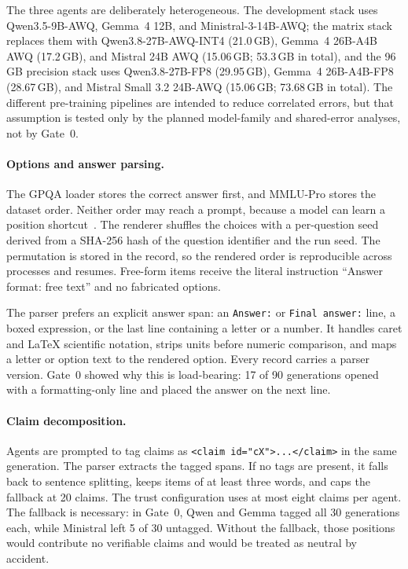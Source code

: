 The three agents are deliberately heterogeneous. The development stack uses Qwen3.5-9B-AWQ, Gemma~4 12B, and Ministral-3-14B-AWQ; the matrix stack replaces them with Qwen3.8-27B-AWQ-INT4 (21.0\,GB), Gemma~4 26B-A4B AWQ (17.2\,GB), and Mistral 24B AWQ (15.06\,GB; 53.3\,GB in total), and the 96\,GB precision stack uses Qwen3.8-27B-FP8 (29.95\,GB), Gemma~4 26B-A4B-FP8 (28.67\,GB), and Mistral Small 3.2 24B-AWQ (15.06\,GB; 73.68\,GB in total). The different pre-training pipelines are intended to reduce correlated errors, but that assumption is tested only by the planned model-family and shared-error analyses, not by Gate~0.

\paragraph*{Options and answer parsing.}
The GPQA loader stores the correct answer first, and MMLU-Pro stores the dataset order. Neither order may reach a prompt, because a model can learn a position shortcut~\cite{zheng2024mcqbias}. The renderer shuffles the choices with a per-question seed derived from a SHA-256 hash of the question identifier and the run seed. The permutation is stored in the record, so the rendered order is reproducible across processes and resumes. Free-form items receive the literal instruction ``Answer format: free text'' and no fabricated options.

The parser prefers an explicit answer span: an \texttt{Answer:} or \texttt{Final answer:} line, a boxed expression, or the last line containing a letter or a number. It handles caret and LaTeX scientific notation, strips units before numeric comparison, and maps a letter or option text to the rendered option. Every record carries a parser version. Gate~0 showed why this is load-bearing: 17 of 90 generations opened with a formatting-only line and placed the answer on the next line.

\paragraph*{Claim decomposition.}
Agents are prompted to tag claims as \texttt{<claim id="cX">...</claim>} in the same generation. The parser extracts the tagged spans. If no tags are present, it falls back to sentence splitting, keeps items of at least three words, and caps the fallback at 20 claims. The trust configuration uses at most eight claims per agent. The fallback is necessary: in Gate~0, Qwen and Gemma tagged all 30 generations each, while Ministral left 5 of 30 untagged. Without the fallback, those positions would contribute no verifiable claims and would be treated as neutral by accident.

